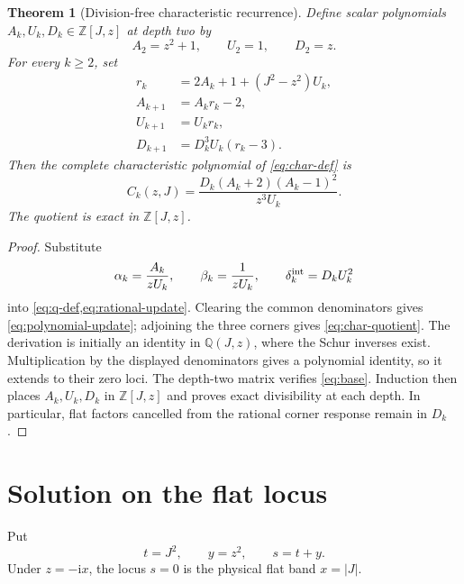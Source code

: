 \documentclass[11pt]{article}
\newtheorem{theorem}{Theorem}
\theoremstyle{remark}
\newcommand{\ii}{\mathrm{i}}
\newcommand{\Z}{\mathbb{Z}}
\begin{document}
\begin{theorem}[Division-free characteristic recurrence]
\label{thm:recurrence}
Define scalar polynomials $A_k,U_k,D_k\in\Z[J,z]$ at depth two by
\begin{equation}
 A_2=z^2+1,\qquad U_2=1,\qquad D_2=z.
 \label{eq:base}
\end{equation}
For every $k\geq2$, set
\begin{subequations}
\label{eq:polynomial-update}
\begin{align}
 r_k&=2A_k+1+(J^2-z^2)U_k,\\
 A_{k+1}&=A_kr_k-2,\\
 U_{k+1}&=U_kr_k,\\
 D_{k+1}&=D_k^3U_k(r_k-3).
\end{align}
\end{subequations}
Then the complete characteristic polynomial of \cref{eq:char-def} is
\begin{equation}
 \boxed{C_k(z,J)=
 \frac{D_k(A_k+2)(A_k-1)^2}{z^3U_k}.}
 \label{eq:char-quotient}
\end{equation}
The quotient is exact in $\Z[J,z]$.
\end{theorem}

\begin{proof}
Substitute
\begin{equation}
 \alpha_k=\frac{A_k}{zU_k},\qquad
 \beta_k=\frac{1}{zU_k},\qquad \delta_k^{\rm int}=D_kU_k^2
 \label{eq:poly-substitution}
\end{equation}
into \cref{eq:q-def,eq:rational-update}.  Clearing the common denominators
gives \cref{eq:polynomial-update}; adjoining the three corners gives
\cref{eq:char-quotient}.  The derivation is initially an identity in
$\mathbb Q(J,z)$, where the Schur inverses exist.  Multiplication by the
displayed denominators gives a polynomial identity, so it extends to their
zero loci.  The depth-two matrix verifies \cref{eq:base}.  Induction then
places $A_k,U_k,D_k$ in $\Z[J,z]$ and proves exact divisibility at each depth.
In particular, flat factors cancelled from the rational corner response
remain in $D_k$.
\end{proof}

\section{Solution on the flat locus}
\label{sec:flat}

Put
\begin{equation}
 t=J^2,\qquad y=z^2,\qquad s=t+y.
 \label{eq:flat-vars}
\end{equation}
Under $z=-\ii x$, the locus $s=0$ is the physical flat band $x=|J|$.
\end{document}
